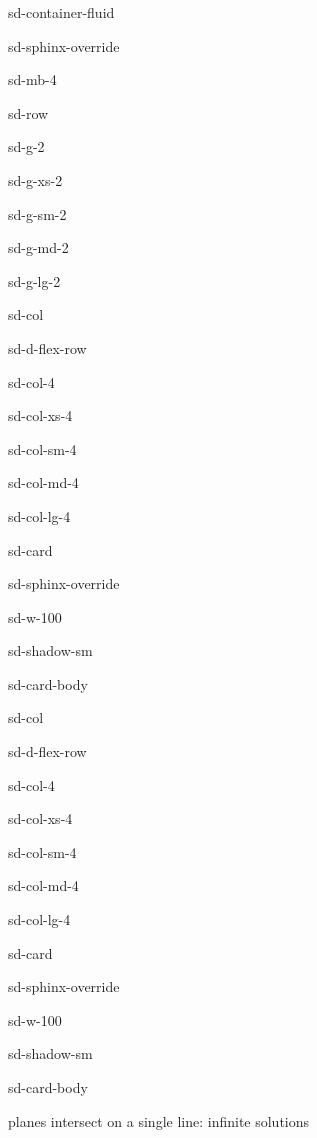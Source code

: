 \documentclass[letterpaper,10pt,english]{jupyterBook}
\begin{document}
\begin{sphinxuseclass}{sd-container-fluid}
\begin{sphinxuseclass}{sd-sphinx-override}
\begin{sphinxuseclass}{sd-mb-4}
\begin{sphinxuseclass}{sd-row}
\begin{sphinxuseclass}{sd-g-2}
\begin{sphinxuseclass}{sd-g-xs-2}
\begin{sphinxuseclass}{sd-g-sm-2}
\begin{sphinxuseclass}{sd-g-md-2}
\begin{sphinxuseclass}{sd-g-lg-2}
\begin{sphinxuseclass}{sd-col}
\begin{sphinxuseclass}{sd-d-flex-row}
\begin{sphinxuseclass}{sd-col-4}
\begin{sphinxuseclass}{sd-col-xs-4}
\begin{sphinxuseclass}{sd-col-sm-4}
\begin{sphinxuseclass}{sd-col-md-4}
\begin{sphinxuseclass}{sd-col-lg-4}
\begin{sphinxuseclass}{sd-card}
\begin{sphinxuseclass}{sd-sphinx-override}
\begin{sphinxuseclass}{sd-w-100}
\begin{sphinxuseclass}{sd-shadow-sm}
\begin{sphinxuseclass}{sd-card-body}
\end{sphinxuseclass}
\end{sphinxuseclass}
\end{sphinxuseclass}
\end{sphinxuseclass}
\end{sphinxuseclass}
\end{sphinxuseclass}
\end{sphinxuseclass}
\end{sphinxuseclass}
\end{sphinxuseclass}
\end{sphinxuseclass}
\end{sphinxuseclass}
\end{sphinxuseclass}
\begin{sphinxuseclass}{sd-col}
\begin{sphinxuseclass}{sd-d-flex-row}
\begin{sphinxuseclass}{sd-col-4}
\begin{sphinxuseclass}{sd-col-xs-4}
\begin{sphinxuseclass}{sd-col-sm-4}
\begin{sphinxuseclass}{sd-col-md-4}
\begin{sphinxuseclass}{sd-col-lg-4}
\begin{sphinxuseclass}{sd-card}
\begin{sphinxuseclass}{sd-sphinx-override}
\begin{sphinxuseclass}{sd-w-100}
\begin{sphinxuseclass}{sd-shadow-sm}
\begin{sphinxuseclass}{sd-card-body}
\begin{figure}[htbp]
\centering

\noindent{}
\end{figure}

 planes intersect on a single line: infinite solutions


\end{sphinxuseclass}
\end{sphinxuseclass}
\end{sphinxuseclass}
\end{sphinxuseclass}
\end{sphinxuseclass}
\end{sphinxuseclass}
\end{sphinxuseclass}
\end{sphinxuseclass}
\end{sphinxuseclass}
\end{sphinxuseclass}
\end{sphinxuseclass}
\end{sphinxuseclass}
\end{sphinxuseclass}
\end{sphinxuseclass}
\end{sphinxuseclass}
\end{sphinxuseclass}
\end{sphinxuseclass}
\end{sphinxuseclass}
\end{sphinxuseclass}
\end{sphinxuseclass}
\end{sphinxuseclass}
\end{document}
